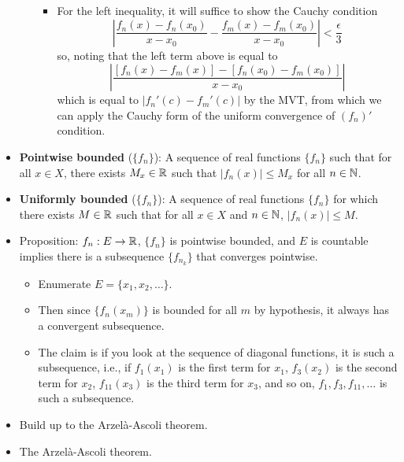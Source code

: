 \documentclass[../notes.tex]{subfiles}
\begin{document}
\begin{itemize}
\begin{itemize}
\begin{itemize}
            \item For the left inequality, it will suffice to show the Cauchy condition
            \begin{equation*}
                \left| \frac{f_n(x)-f_n(x_0)}{x-x_0}-\frac{f_m(x)-f_m(x_0)}{x-x_0} \right| < \frac{\epsilon}{3}
            \end{equation*}
            so, noting that the left term above is equal to
            \begin{equation*}
                \left| \frac{[f_n(x)-f_m(x)]-[f_n(x_0)-f_m(x_0)]}{x-x_0} \right|
            \end{equation*}
            which is equal to $|f_n'(c)-f_m'(c)|$ by the MVT, from which we can apply the Cauchy form of the uniform convergence of $(f_n)'$ condition.
        \end{itemize}
    \end{itemize}
    \item \textbf{Pointwise bounded} ($\{f_n\}$): A sequence of real functions $\{f_n\}$ such that for all $x\in X$, there exists $M_x\in\mathbb{R}$ such that $|f_n(x)|\leq M_x$ for all $n\in\mathbb{N}$.
    \item \textbf{Uniformly bounded} ($\{f_n\}$): A sequence of real functions $\{f_n\}$ for which there exists $M\in\mathbb{R}$ such that for all $x\in X$ and $n\in\mathbb{N}$, $|f_n(x)|\leq M$.
    \item Proposition: $f_n:E\to\mathbb{R}$, $\{f_n\}$ is pointwise bounded, and $E$ is countable implies there is a subsequence $\{f_{n_k}\}$ that converges pointwise.
    \begin{itemize}
        \item Enumerate $E=\{x_1,x_2,\dots\}$.
        \item Then since $\{f_n(x_m)\}$ is bounded for all $m$ by hypothesis, it always has a convergent subsequence.
        \item The claim is if you look at the sequence of diagonal functions, it is such a subsequence, i.e., if $f_1(x_1)$ is the first term for $x_1$, $f_3(x_2)$ is the second term for $x_2$, $f_{11}(x_3)$ is the third term for $x_3$, and so on, $f_1,f_3,f_{11},\dots$ is such a subsequence.
    \end{itemize}
    \item {}Build up to the Arzel\`{a}-Ascoli theorem.
    \item {}The Arzel\`{a}-Ascoli theorem.
\end{itemize}
\end{document}
